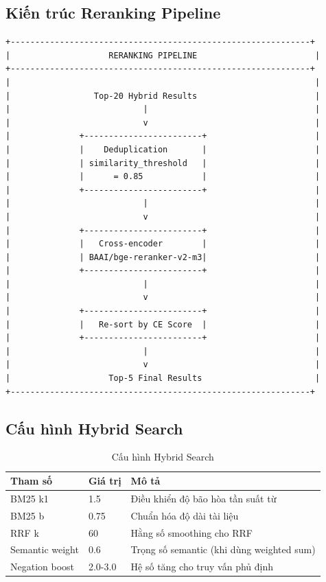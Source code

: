 \documentclass[../DoAn.tex]{subfiles}
\begin{document}
\subsection{Kiến trúc Reranking Pipeline}
\begin{verbatim}
+-------------------------------------------------------------+
|                    RERANKING PIPELINE                        |
+-------------------------------------------------------------+
|                                                              |
|                 Top-20 Hybrid Results                        |
|                           |                                  |
|                           v                                  |
|              +------------------------+                      |
|              |    Deduplication       |                      |
|              | similarity_threshold   |                      |
|              |      = 0.85            |                      |
|              +------------------------+                      |
|                           |                                  |
|                           v                                  |
|              +------------------------+                      |
|              |   Cross-encoder        |                      |
|              | BAAI/bge-reranker-v2-m3|                      |
|              +------------------------+                      |
|                           |                                  |
|                           v                                  |
|              +------------------------+                      |
|              |   Re-sort by CE Score  |                      |
|              +------------------------+                      |
|                           |                                  |
|                           v                                  |
|                    Top-5 Final Results                       |
+-------------------------------------------------------------+
\end{verbatim}

\subsection{Cấu hình Hybrid Search}
\begin{table}[h]
\centering
\begin{tabular}{|l|l|l|}
\hline
\textbf{Tham số} & \textbf{Giá trị} & \textbf{Mô tả} \\
\hline
BM25 k1 & 1.5 & Điều khiển độ bão hòa tần suất từ \\
\hline
BM25 b & 0.75 & Chuẩn hóa độ dài tài liệu \\
\hline
RRF k & 60 & Hằng số smoothing cho RRF \\
\hline
Semantic weight & 0.6 & Trọng số semantic (khi dùng weighted sum) \\
\hline
Negation boost & 2.0-3.0 & Hệ số tăng cho truy vấn phủ định \\
\hline
\end{tabular}
\caption{Cấu hình Hybrid Search}
\end{table}
\end{document}
